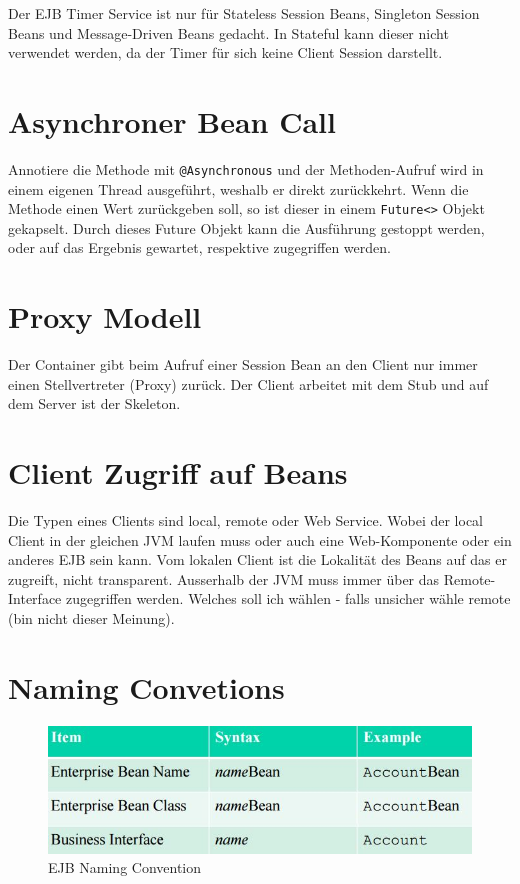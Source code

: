 Der EJB Timer Service ist nur für Stateless Session Beans, Singleton Session Beans und Message-Driven Beans gedacht. In Stateful kann dieser nicht verwendet werden, da der Timer für sich keine Client Session darstellt.

\section{Asynchroner Bean Call}
Annotiere die Methode mit \verb|@Asynchronous| und der Methoden-Aufruf wird in einem eigenen Thread ausgeführt, weshalb er direkt zurückkehrt. Wenn die Methode einen Wert zurückgeben soll, so ist dieser in einem \verb|Future<>| Objekt gekapselt. Durch dieses Future Objekt kann die Ausführung gestoppt werden, oder auf das Ergebnis gewartet, respektive zugegriffen werden.

\section{Proxy Modell}
Der Container gibt beim Aufruf einer Session Bean an den Client nur immer einen Stellvertreter (Proxy) zurück. Der Client arbeitet mit dem Stub und auf dem Server ist der Skeleton.

\section{Client Zugriff auf Beans}
Die Typen eines Clients sind local, remote oder Web Service. Wobei der local Client in der gleichen JVM laufen muss oder auch eine Web-Komponente oder ein anderes EJB sein kann. Vom lokalen Client ist die Lokalität des Beans auf das er zugreift, nicht transparent. Ausserhalb der JVM muss immer über das Remote-Interface zugegriffen werden. Welches soll ich wählen - falls unsicher wähle remote (bin nicht dieser Meinung).

\newpage

\section{Naming Convetions}
\begin{figure}[h!]
\centering
\includegraphics[width=0.7\linewidth]{fig/ejb-naming-convention}
\caption{EJB Naming Convention}
\label{fig:ejb-naming-convention}
\end{figure}

